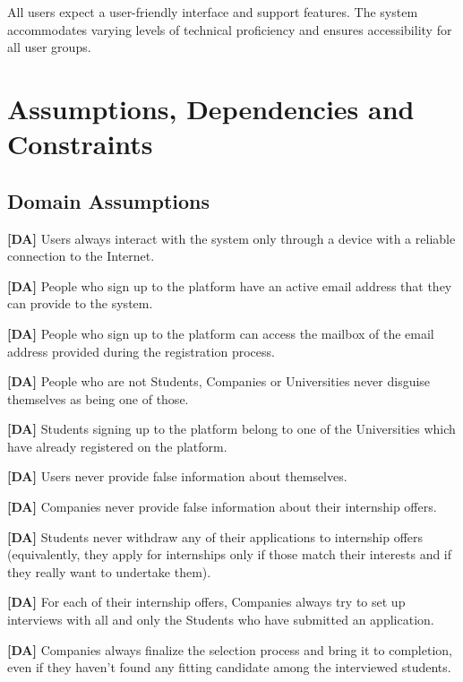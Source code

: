 All users expect a user-friendly interface and support features. The system accommodates varying levels of technical proficiency and ensures accessibility for all user groups.

\section{Assumptions, Dependencies and Constraints}
\label{sec:assumptions_dependencies_constraints}%

\subsection{Domain Assumptions}
\label{subsec:domain_assumptions}%

\setcounter{da}{1}
\newcommand{\cda}{\theda{}}

    \textbf{[DA\cda]} Users always interact with the system only through a device with a reliable connection to the Internet.

    \textbf{[DA\cda]} People who sign up to the platform have an active email address that they can provide to the system.

    \textbf{[DA\cda]} People who sign up to the platform can access the mailbox of the email address provided during the registration process.

    \textbf{[DA\cda]} People who are not Students, Companies or Universities never disguise themselves as being one of those.

    \textbf{[DA\cda]} Students signing up to the platform belong to one of the Universities which have already registered on the platform.

    \textbf{[DA\cda]} Users never provide false information about themselves.

    \textbf{[DA\cda]} Companies never provide false information about their internship offers.

    \textbf{[DA\cda]} Students never withdraw any of their applications to internship offers (equivalently, they apply for internships only if those match their interests and if they really want to undertake them).

    \textbf{[DA\cda]} For each of their internship offers, Companies always try to set up interviews with all and only the Students who have submitted an application.

    \textbf{[DA\cda]} Companies always finalize the selection process and bring it to completion, even if they haven't found any fitting candidate among the interviewed students.

